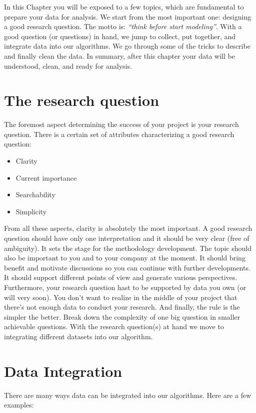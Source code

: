 In this Chapter you will be exposed to a few topics, which are fundamental to prepare your data for analysis. We start from the most important one: designing a good research question. The motto is: \textit{``think before start modeling''}. With a good question (or questions) in hand, we jump to collect, put together, and integrate data into our algorithms. We go through some of the tricks to describe and finally clean the data. In summary, after this chapter your data will be understood, clean, and ready for analysis.

\section{The research question}\label{RQ}

The foremost aspect determining the success of your project is your research question. There is a certain set of attributes characterizing a good research question:

\begin{itemize}
	\item Clarity
	\item Current importance
	\item Searchability
	\item Simplicity
\end{itemize}

From all these aspects, clarity is absolutely the most important. A good research question should have only one interpretation and it should be very clear (free of ambiguity). It sets the stage for the methodology development. The topic should also be important to you and to your company at the moment. It should bring benefit and motivate discussions so you can continue with further developments. It should support different points of view and generate various perspectives. Furthermore, your research question hast to be supported by data you own (or will very soon). You don't want to realize in the middle of your project that there's not enough data to conduct your research. And finally, the rule is the simpler the better. Break down the complexity of one big question in smaller achievable questions. With the research question(s) at hand we move to integrating different datasets into our algorithm.

\section{Data Integration}\label{dataM}

There are many ways data can be integrated into our algorithms. Here are a few examples:

